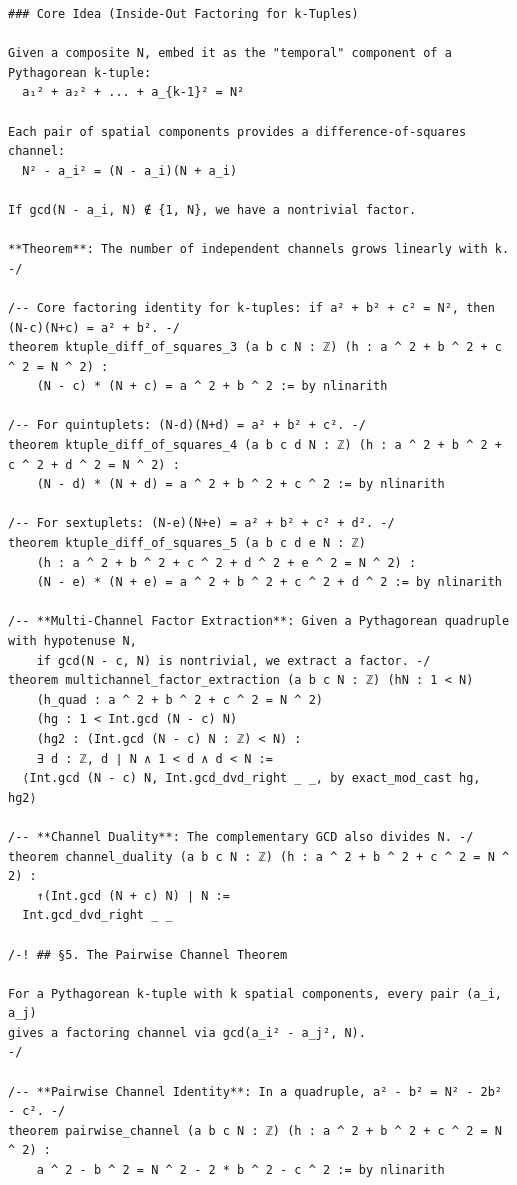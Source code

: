 \documentclass[11pt,openany]{book}
\theoremstyle{definition}
\theoremstyle{plain}
\theoremstyle{remark}
\begin{document}
\begin{lstlisting}[style=lean]
### Core Idea (Inside-Out Factoring for k-Tuples)

Given a composite N, embed it as the "temporal" component of a Pythagorean k-tuple:
  a₁² + a₂² + ... + a_{k-1}² = N²

Each pair of spatial components provides a difference-of-squares channel:
  N² - a_i² = (N - a_i)(N + a_i)

If gcd(N - a_i, N) ∉ {1, N}, we have a nontrivial factor.

**Theorem**: The number of independent channels grows linearly with k.
-/

/-- Core factoring identity for k-tuples: if a² + b² + c² = N², then (N-c)(N+c) = a² + b². -/
theorem ktuple_diff_of_squares_3 (a b c N : ℤ) (h : a ^ 2 + b ^ 2 + c ^ 2 = N ^ 2) :
    (N - c) * (N + c) = a ^ 2 + b ^ 2 := by nlinarith

/-- For quintuplets: (N-d)(N+d) = a² + b² + c². -/
theorem ktuple_diff_of_squares_4 (a b c d N : ℤ) (h : a ^ 2 + b ^ 2 + c ^ 2 + d ^ 2 = N ^ 2) :
    (N - d) * (N + d) = a ^ 2 + b ^ 2 + c ^ 2 := by nlinarith

/-- For sextuplets: (N-e)(N+e) = a² + b² + c² + d². -/
theorem ktuple_diff_of_squares_5 (a b c d e N : ℤ)
    (h : a ^ 2 + b ^ 2 + c ^ 2 + d ^ 2 + e ^ 2 = N ^ 2) :
    (N - e) * (N + e) = a ^ 2 + b ^ 2 + c ^ 2 + d ^ 2 := by nlinarith

/-- **Multi-Channel Factor Extraction**: Given a Pythagorean quadruple with hypotenuse N,
    if gcd(N - c, N) is nontrivial, we extract a factor. -/
theorem multichannel_factor_extraction (a b c N : ℤ) (hN : 1 < N)
    (h_quad : a ^ 2 + b ^ 2 + c ^ 2 = N ^ 2)
    (hg : 1 < Int.gcd (N - c) N)
    (hg2 : (Int.gcd (N - c) N : ℤ) < N) :
    ∃ d : ℤ, d ∣ N ∧ 1 < d ∧ d < N :=
  ⟨Int.gcd (N - c) N, Int.gcd_dvd_right _ _, by exact_mod_cast hg, hg2⟩

/-- **Channel Duality**: The complementary GCD also divides N. -/
theorem channel_duality (a b c N : ℤ) (h : a ^ 2 + b ^ 2 + c ^ 2 = N ^ 2) :
    ↑(Int.gcd (N + c) N) ∣ N :=
  Int.gcd_dvd_right _ _

/-! ## §5. The Pairwise Channel Theorem

For a Pythagorean k-tuple with k spatial components, every pair (a_i, a_j)
gives a factoring channel via gcd(a_i² - a_j², N).
-/

/-- **Pairwise Channel Identity**: In a quadruple, a² - b² = N² - 2b² - c². -/
theorem pairwise_channel (a b c N : ℤ) (h : a ^ 2 + b ^ 2 + c ^ 2 = N ^ 2) :
    a ^ 2 - b ^ 2 = N ^ 2 - 2 * b ^ 2 - c ^ 2 := by nlinarith


\end{lstlisting}
\end{document}

